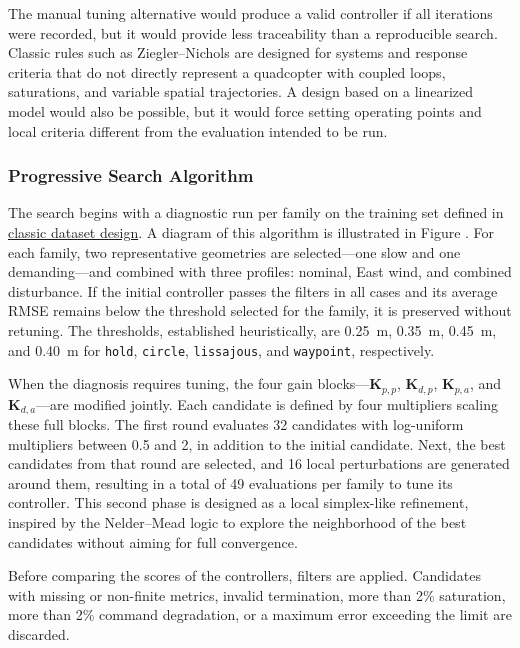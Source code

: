 The manual tuning alternative would produce a valid controller if all iterations were recorded, but it would provide less traceability than a reproducible search. Classic rules such as Ziegler--Nichols are designed for systems and response criteria that do not directly represent a quadcopter with coupled loops, saturations, and variable spatial trajectories. A design based on a linearized model would also be possible, but it would force setting operating points and local criteria different from the evaluation intended to be run.

\subsubsection*{Progressive Search Algorithm}
\label{subsubsec:busqueda-progresiva}
The search begins with a diagnostic run per family on the training set defined in \hyperref[subsubsec:diseno-dataset-clasico]{classic dataset design}. A diagram of this algorithm is illustrated in Figure . For each family, two representative geometries are selected---one slow and one demanding---and combined with three profiles: nominal, East wind, and combined disturbance. If the initial controller passes the filters in all cases and its average RMSE remains below the threshold selected for the family, it is preserved without retuning. The thresholds, established heuristically, are \SI{0.25}{m}, \SI{0.35}{m}, \SI{0.45}{m}, and \SI{0.40}{m} for \texttt{hold}, \texttt{circle}, \texttt{lissajous}, and \texttt{waypoint}, respectively.

When the diagnosis requires tuning, the four gain blocks---$\bm{K}_{p,p}$, $\bm{K}_{d,p}$, $\bm{K}_{p,a}$, and $\bm{K}_{d,a}$---are modified jointly. Each candidate is defined by four multipliers scaling these full blocks. The first round evaluates 32 candidates with log-uniform multipliers between 0.5 and 2, in addition to the initial candidate. Next, the best candidates from that round are selected, and 16 local perturbations are generated around them, resulting in a total of 49 evaluations per family to tune its controller. This second phase is designed as a local simplex-like refinement, inspired by the Nelder--Mead logic \cite{nelder1965simplex} to explore the neighborhood of the best candidates without aiming for full convergence.

Before comparing the scores of the controllers, filters are applied. Candidates with missing or non-finite metrics, invalid termination, more than 2\% saturation, more than 2\% command degradation, or a maximum error exceeding the limit are discarded.

